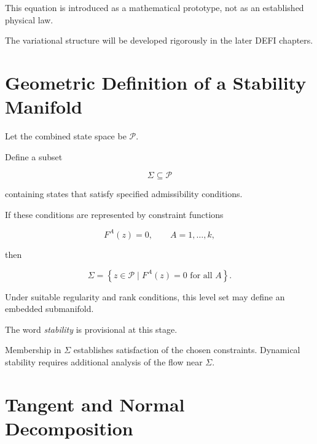 \documentclass[12pt,oneside]{book}
\begin{document}
This equation is introduced as a mathematical prototype, not as
an established physical law.

The variational structure will be developed rigorously in the
later DEFI chapters.


\section{Geometric Definition of a Stability Manifold}
\label{sec:geometric-stability-manifold}

Let the combined state space be \(\mathcal{P}\).

Define a subset

\begin{equation}
    \Sigma
    \subseteq
    \mathcal{P}
    \label{eq:stability-manifold-definition}
\end{equation}

containing states that satisfy specified admissibility
conditions.

If these conditions are represented by constraint functions

\begin{equation}
    F^A(z)
    =
    0,
    \qquad
    A=1,\ldots,k,
    \label{eq:stability-constraints}
\end{equation}

then

\begin{equation}
    \Sigma
    =
    \left\{
        z\in\mathcal{P}
        \mid
        F^A(z)=0
        \text{ for all }A
    \right\}.
    \label{eq:constraint-defined-manifold}
\end{equation}

Under suitable regularity and rank conditions, this level set
may define an embedded submanifold.

The word \emph{stability} is provisional at this stage.

Membership in \(\Sigma\) establishes satisfaction of the chosen
constraints. Dynamical stability requires additional analysis
of the flow near \(\Sigma\).


\section{Tangent and Normal Decomposition}
\label{sec:tangent-normal-decomposition}
\end{document}
